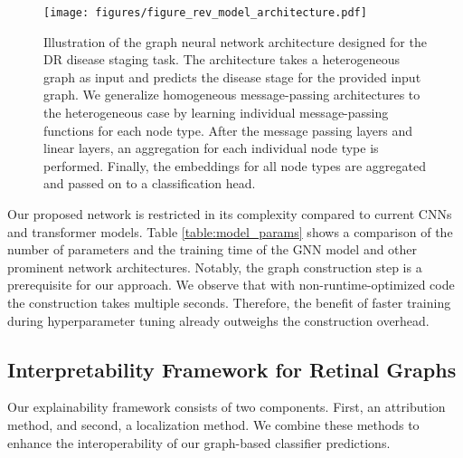 \begin{figure*}[!ht]
    \centering
    \texttt{[image: figures/figure\_rev\_model\_architecture.pdf]}
    \caption{Illustration of the graph neural network architecture designed for the DR disease staging task. The architecture takes a heterogeneous graph as input and predicts the disease stage for the provided input graph. We generalize homogeneous message-passing architectures to the heterogeneous case by learning individual message-passing functions for each node type. After the message passing layers and linear layers, an aggregation for each individual node type is performed. Finally, the embeddings for all node types are aggregated and passed on to a classification head.}
        \vspace{-0.3cm}
    \label{fig:arch}
\end{figure*}

Our proposed network is restricted in its complexity compared to current CNNs and transformer models. Table \ref{table:model_params} shows a comparison of the number of parameters and the training time of the GNN model and other prominent network architectures. Notably, the graph construction step is a prerequisite for our approach. We observe that with non-runtime-optimized code the construction takes multiple seconds. Therefore, the benefit of faster training during hyperparameter tuning already outweighs the construction overhead. 



\subsection{Interpretability Framework for Retinal Graphs}
Our explainability framework consists of two components. First, an attribution method, and second, a localization method. We combine these methods to enhance the interoperability of our graph-based classifier predictions. 

